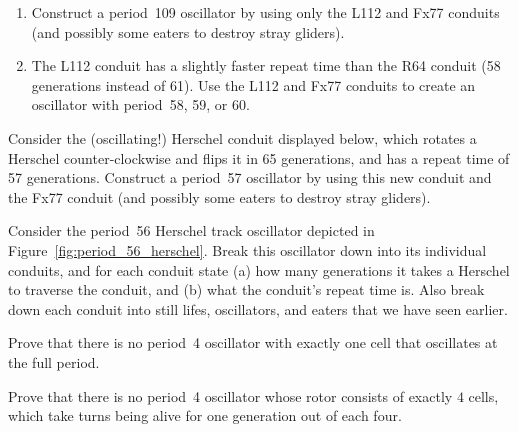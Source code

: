 \begin{multicols}{2}
\begin{problem}
		\begin{enumerate}[label=\bf\color{ocre}(\alph*)]
			\item {} Construct a period~109 oscillator by using only the L112 and Fx77 conduits (and possibly some eaters to destroy stray gliders).
			
			\item {} The L112 conduit has a slightly faster repeat time than the R64 conduit (58 generations instead of 61). Use the L112 and Fx77 conduits to create an oscillator with period~58, 59, or 60.
		\end{enumerate}
	\end{problem}
	
	
	\mfilbreak
	
	
	\begin{problem}\label{exer:period_57_herschel} 
		Consider the (oscillating!) Herschel conduit displayed below, which rotates a Herschel counter-clockwise and flips it in 65 generations, and has a repeat time of 57 generations. Construct a period~57 oscillator by using this new conduit and the Fx77 conduit (and possibly some eaters to destroy stray gliders).
		\begin{center}
		\end{center}
	\end{problem}
	
	
	\mfilbreak
	
	
	\begin{problem}\label{exer:period_56_herschel} 
		Consider the period~56 Herschel track oscillator depicted in Figure~\ref{fig:period_56_herschel}. Break this oscillator down into its individual conduits, and for each conduit state (a) how many generations it takes a Herschel to traverse the conduit, and (b) what the conduit's repeat time is. Also break down each conduit into still lifes, oscillators, and eaters that we have seen earlier.
	\end{problem}
	
	
	\mfilbreak
	
	
	\begin{problemstar}\label{exer:p4_oscillator} 
		Prove that there is no period~4 oscillator with exactly one cell that oscillates at the full period.
	\end{problemstar}


	\mfilbreak
	
	
	\begin{problem}\label{exer:p4_oscillator_impb} 
		Prove that there is no period~4 oscillator whose rotor consists of exactly $4$ cells, which take turns being alive for one generation out of each four.
	\end{problem}
	

\end{multicols}

